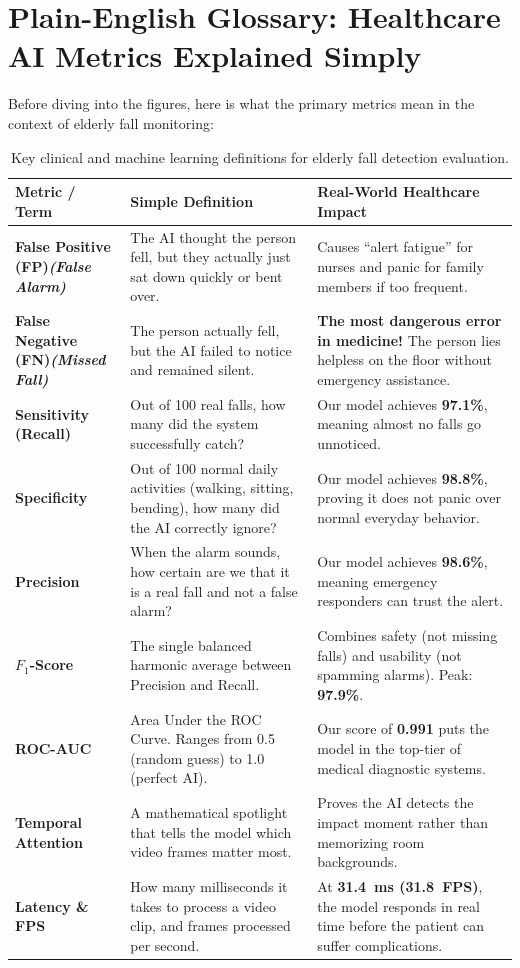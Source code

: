 \documentclass[11pt,a4paper]{article}
\begin{document}
\section{Plain-English Glossary: Healthcare AI Metrics Explained Simply}
Before diving into the figures, here is what the primary metrics mean in the context of elderly fall monitoring:

\begin{table}[H]
\centering
\small
\renewcommand{\arraystretch}{1.3}
\begin{tabular}{>{\bfseries}p{3.2cm} p{6.0cm} p{6.8cm}}
\toprule
\textbf{Metric / Term} & \textbf{Simple Definition} & \textbf{Real-World Healthcare Impact} \\
\midrule
False Positive (FP)\newline\textit{(False Alarm)} & 
The AI thought the person fell, but they actually just sat down quickly or bent over. & 
Causes ``alert fatigue'' for nurses and panic for family members if too frequent. \\
\midrule
False Negative (FN)\newline\textit{(Missed Fall)} & 
The person actually fell, but the AI failed to notice and remained silent. & 
\textbf{The most dangerous error in medicine!} The person lies helpless on the floor without emergency assistance. \\
\midrule
Sensitivity (Recall) & 
Out of 100 real falls, how many did the system successfully catch? & 
Our model achieves \textbf{97.1\%}, meaning almost no falls go unnoticed. \\
\midrule
Specificity & 
Out of 100 normal daily activities (walking, sitting, bending), how many did the AI correctly ignore? & 
Our model achieves \textbf{98.8\%}, proving it does not panic over normal everyday behavior. \\
\midrule
Precision & 
When the alarm sounds, how certain are we that it is a real fall and not a false alarm? & 
Our model achieves \textbf{98.6\%}, meaning emergency responders can trust the alert. \\
\midrule
$F_1$-Score & 
The single balanced harmonic average between Precision and Recall. & 
Combines safety (not missing falls) and usability (not spamming alarms). Peak: \textbf{97.9\%}. \\
\midrule
ROC-AUC & 
Area Under the ROC Curve. Ranges from 0.5 (random guess) to 1.0 (perfect AI). & 
Our score of \textbf{0.991} puts the model in the top-tier of medical diagnostic systems. \\
\midrule
Temporal Attention & 
A mathematical spotlight that tells the model which video frames matter most. & 
Proves the AI detects the impact moment rather than memorizing room backgrounds. \\
\midrule
Latency \& FPS & 
How many milliseconds it takes to process a video clip, and frames processed per second. & 
At \textbf{31.4~ms (31.8~FPS)}, the model responds in real time before the patient can suffer complications. \\
\bottomrule
\end{tabular}
\caption{Key clinical and machine learning definitions for elderly fall detection evaluation.}
\end{table}
\end{document}
